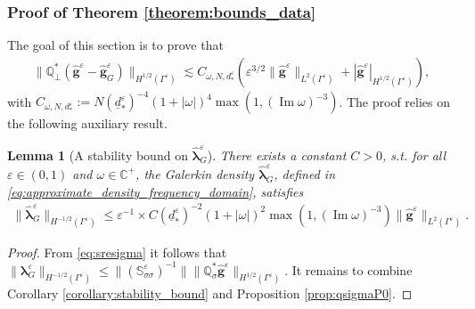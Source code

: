 \documentclass[]{article}
\newtheorem{lemma}{Lemma}
\numberwithin{equation}{section}
\numberwithin{theorem}{section}
\numberwithin{lemma}{section}
\numberwithin{corollary}{section}
\numberwithin{proposition}{section}
\numberwithin{definition}{section}
\newcommand{\blambda}{\boldsymbol{\lambda}}
\newcommand{\re}{\varepsilon}
\renewcommand{\vec}{\boldsymbol}
\renewcommand{\Im}{\operatorname{Im}}
\begin{document}
	\subsubsection{Proof of Theorem \ref{theorem:bounds_data}}
	\label{sec:data_bound}
	The goal of this section is to prove that
	\begin{align*}%
		\|\mathbb{Q}^{*}_{\perp}( \hat{\vec{g}}^{\re}-\hat{\vec{g}}^{\re}_G)\|_{H^{1/2}(\Gamma^{\re})}  
		\lesssim C_{\omega, N, d^{\re}_*} (\re^{3/2} \|\hat{\vec{g}}^{\re} \|_{L^2(\Gamma^{\re})} + |  \hat{\vec{g}}^{\re} |_{H^{1/2}(\Gamma^{\re})} ),
	\end{align*}
	with $C_{\omega, N, d^{\re}_*} := N (\underline{d}^{\re}_{*})^{-4} (1+|\omega|)^4 \max(1, (\operatorname{Im} \omega)^{-3})$.
	The proof relies on the following auxiliary result. 
	\begin{lemma}[A stability bound on $\hat{\vec{\lambda}}^{\re}_G$]
		\label{lemma:stability_bound_lambda_G}
		There exists a constant $C>0$, s.t. for all $\re \in (0,1)$ and $\omega \in \mathbb{C}^+$, the Galerkin density $\hat{\vec{\lambda}}^{\re}_G$, defined in \eqref{eq:approximate_density_frequency_domain}, satisfies
		\begin{align*}%
			\| \hat{\vec{\lambda}}^{\re}_G \|_{H^{-1/2}(\Gamma^{\re})} \leq\re^{-1} \times C (\underline{d}^{\re}_{*})^{-2} (1+  |\omega|)^2 \max(1, (\Im  \omega)^{-3}) \| \hat{\vec{g}}^\re \|_{L^2(\Gamma^{\re})}. 
		\end{align*}
	\end{lemma}
	\begin{proof}
		From \eqref{eq:sresigma} it follows that  $\|\blambda^{\re}_G\|_{H^{-1/2}(\Gamma^{\re})}\leq \|\left(\mathbb{S}_{\sigma\sigma}^{\re}\right)^{-1}\|\|\mathbb{Q}_{\sigma}^*\vec{\hat{g}}^{\re}\|_{H^{1/2}(\Gamma^{\re})}$. It remains to combine Corollary \ref{corollary:stability_bound} and Proposition \ref{prop:qsigmaP0}. 
	\end{proof}
\end{document}
